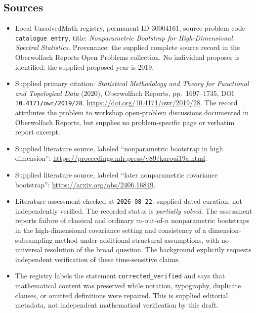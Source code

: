 \documentclass[11pt]{article}
\begin{document}
\subsection{Sources}
\begin{itemize}
\item Local UnsolvedMath registry, permanent ID \(30004161\), source problem code \texttt{catalogue entry}, title: \emph{Nonparametric Bootstrap for High-Dimensional Spectral Statistics}. Provenance: the supplied complete source record in the Oberwolfach Reports Open Problems collection. No individual proposer is identified; the supplied proposed year is 2019.
\item Supplied primary citation: \emph{Statistical Methodology and Theory for Functional and Topological Data} (2020), Oberwolfach Reports, pp.\ 1697--1735, DOI \texttt{10.4171/owr/2019/28}. \url{https://doi.org/10.4171/owr/2019/28}. The record attributes the problem to workshop open-problem discussions documented in Oberwolfach Reports, but supplies no problem-specific page or verbatim report excerpt.
\item Supplied literature source, labeled ``nonparametric bootstrap in high dimension'': \url{https://proceedings.mlr.press/v89/karoui19a.html}.
\item Supplied literature source, labeled ``later nonparametric covariance bootstrap'': \url{https://arxiv.org/abs/2406.16849}.
\item Literature assessment checked at \texttt{2026-08-22}: supplied dated curation, not independently verified. The recorded status is \emph{partially solved}. The assessment reports failure of classical and ordinary \(m\)-out-of-\(n\) nonparametric bootstraps in the high-dimensional covariance setting and consistency of a dimension-subsampling method under additional structural assumptions, with no universal resolution of the broad question. The background explicitly requests independent verification of these time-sensitive claims.
\item The registry labels the statement \texttt{corrected\_verified} and says that mathematical content was preserved while notation, typography, duplicate clauses, or omitted definitions were repaired. This is supplied editorial metadata, not independent mathematical verification by this draft.
\end{itemize}
\end{document}
